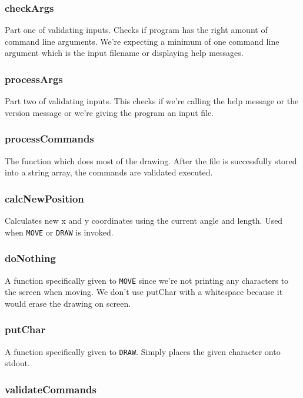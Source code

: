 \documentclass[a4paper, 12pt, titlepage]{article}
\newcommand{\code}[1]{\small\texttt{#1}\normalsize}
\begin{document}
\subsubsection{checkArgs}

Part one of validating inputs. Checks if program has the right amount of
command line arguments. We're expecting a minimum of one command line
argument which is the input filename or displaying help messages.

\subsubsection{processArgs}

Part two of validating inputs. This checks if we're calling the help message
or the version message or we're giving the program an input file.

\subsubsection{processCommands}

The function which does most of the drawing. After the file is successfully
stored into a string array, the commands are validated executed.

\subsubsection{calcNewPosition}

Calculates new x and y coordinates using the current angle and length.
Used when \code{MOVE} or \code{DRAW} is invoked.

\subsubsection{doNothing}

A function specifically given to \code{MOVE} since we're not printing any
characters to the screen when moving. We don't use putChar with a whitespace
because it would erase the drawing on screen.

\subsubsection{putChar}

A function specifically given to \code{DRAW}. Simply places the given
character onto stdout.

\subsubsection{validateCommands}
\end{document}

